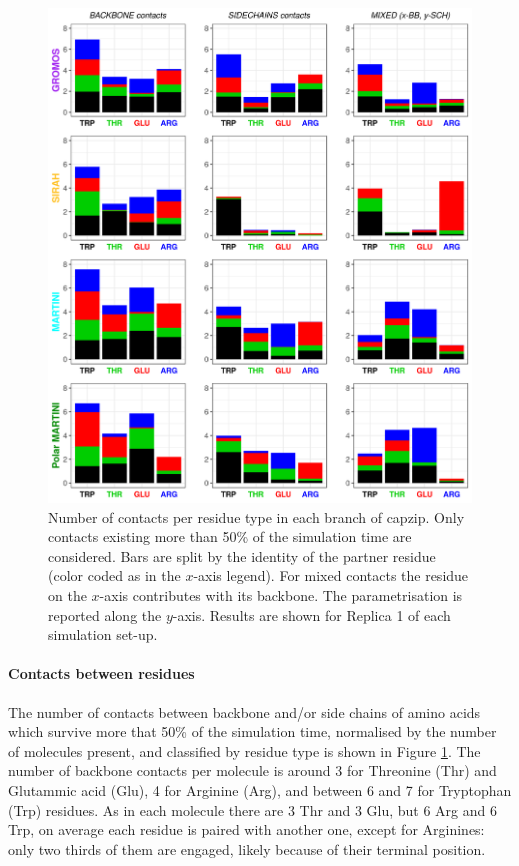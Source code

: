 \begin{figure}[p]
\centering
\includegraphics[width=0.95\linewidth]{3results_capsule/pics/new_rep1_allFF.png}
\caption[Contacts between molecules during simulations of the buckyball]{Number of contacts per residue type in each branch of capzip. Only contacts existing more than 50\% of the simulation time are considered. Bars are split by the identity of the partner residue (color coded as in the $x$-axis legend). For mixed contacts the residue on the $x$-axis contributes with its backbone. The parametrisation is reported along the $y$-axis. Results are shown for Replica 1 of each simulation set-up.}
\label{fig:BTI_cont}
\end{figure}

\paragraph{Contacts between residues} The number of contacts between backbone and/or side chains of amino acids which survive more that 50\% of the simulation time, normalised by the number of molecules present, and classified by residue type is shown in Figure \ref{fig:BTI_cont}. 
%
The number of backbone contacts per molecule is around 3 for Threonine (Thr) and Glutammic acid (Glu), 4 for Arginine (Arg), and between 6 and 7 for Tryptophan (Trp) residues.
%
As in each molecule there are 3 Thr and 3 Glu, but 6 Arg and 6 Trp, on average each residue is paired with another one, except for Arginines: only two thirds of them are engaged, likely because of their terminal position.

